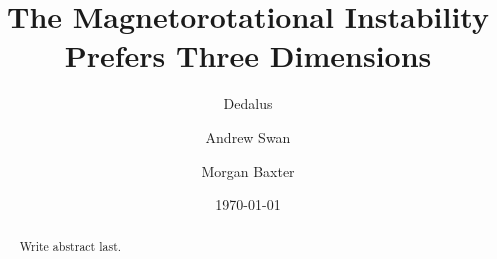 \documentclass[aps,prl,reprint,groupedaddress]{revtex4-1}
\begin{document}

\title{The Magnetorotational Instability Prefers Three Dimensions}


\author{Dedalus}
\author{Andrew Swan}
\author{Morgan Baxter}

\affiliation{}


\date{\today}

\begin{abstract}
Write abstract last.
\end{abstract}

\pacs{}

\maketitle

\end{document}
